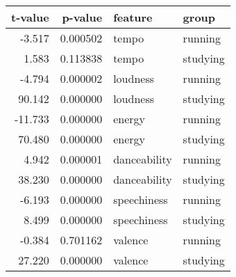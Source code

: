 \begin{tabular}{rrll}
\toprule
 t-value &  p-value &      feature &    group \\
\midrule
  -3.517 & 0.000502 &        tempo &  running \\
   1.583 & 0.113838 &        tempo & studying \\
  -4.794 & 0.000002 &     loudness &  running \\
  90.142 & 0.000000 &     loudness & studying \\
 -11.733 & 0.000000 &       energy &  running \\
  70.480 & 0.000000 &       energy & studying \\
   4.942 & 0.000001 & danceability &  running \\
  38.230 & 0.000000 & danceability & studying \\
  -6.193 & 0.000000 &  speechiness &  running \\
   8.499 & 0.000000 &  speechiness & studying \\
  -0.384 & 0.701162 &      valence &  running \\
  27.220 & 0.000000 &      valence & studying \\
\bottomrule
\end{tabular}
